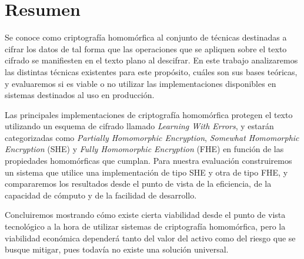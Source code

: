 \chapter*{Resumen}
\label{chap:resumen}

Se conoce como criptografía homomórfica al conjunto de técnicas destinadas a cifrar los datos de tal forma que las operaciones que se apliquen sobre el texto cifrado se manifiesten en el texto plano al descifrar. En este trabajo analizaremos las distintas técnicas existentes para este propósito, cuáles son sus bases teóricas, y evaluaremos si es viable o no utilizar las implementaciones disponibles en sistemas destinados al uso en producción. 

Las principales implementaciones de criptografía homomórfica protegen el texto utilizando un esquema de cifrado llamado \textit{Learning With Errors}, y estarán categorizadas como \textit{Partially Homomorphic Encryption}, \textit{Somewhat Homomorphic Encryption} (SHE) y \textit{Fully Homomorphic Encryption} (FHE) en función de las propiedades homomórficas que cumplan. Para nuestra evaluación construiremos un sistema que utilice una implementación de tipo SHE y otra de tipo FHE, y compararemos los resultados desde el punto de vista de la eficiencia, de la capacidad de cómputo y de la facilidad de desarrollo. 

Concluiremos mostrando cómo existe cierta viabilidad desde el punto de vista tecnológico a la hora de utilizar sistemas de criptografía homomórfica, pero la viabilidad económica dependerá tanto del valor del activo como del riesgo que se busque mitigar, pues todavía no existe una solución universal.